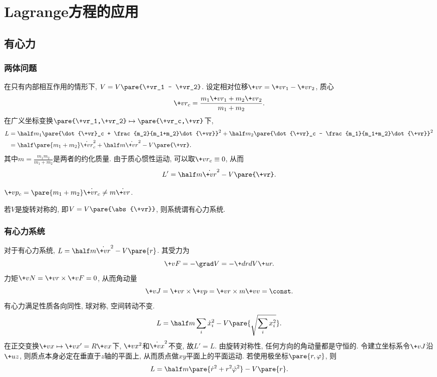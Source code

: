 \documentclass[../LectureNotes.tex]{subfiles}
\begin{document}
\section{Lagrange方程的应用} %
\label{sec:lagrange方程的应用}

\subsection{有心力} %
\label{sub:有心力}

\subsubsection{两体问题} %
\label{ssub:两体问题}

\begin{figure}[ht]
    \centering
\end{figure}
在只有内部相互作用的情形下, $V = V\pare{\+vr_1 - \+vr_2}$. 设定相对位移$\+vr = \+vr_1 - \+vr_2$, 质心
\[ \+vr_c = \frac{m_1\+vr_1 + m_2\+vr_2}{m_1+m_2}. \]
在广义坐标变换$\pare{\+vr_1,\+vr_2}\mapsto \pare{\+vr_c,\+vr}$下,
\begin{align*}
    L &= \half m_1\pare{\dot{\+vr}_c + \frac{m_2}{m_1+m_2}\dot{\+vr}}^2 + \half m_2 \pare{\dot{\+vr}_c - \frac{m_1}{m_1+m_2}\dot{\+vr}}^2 \\
    &= \half\pare{m_1+m_2}\dot{\+vr}_c^2 + \half m\dot{\+vr}^2 - V\pare{\+vr}.
\end{align*}
其中$\displaystyle m = \frac{m_1m_2}{m_1+m_2}$是两者的约化质量. 由于质心惯性运动, 可以取$\+vr_c \equiv 0$, 从而
\[ L' = \half m\dot{\+vr}^2 - V\pare{\+vr}. \]
\begin{remark}
    $\+vp_c = \pare{m_1+m_2}\dot{\+vr_c} \neq m\dot{\+vr}$.
\end{remark}
若$V$是旋转对称的, 即$V = V\pare{\abs{\+vr}}$, 则系统谓有心力系统.


\subsubsection{有心力系统} %
\label{ssub:有心力系统}

对于有心力系统, $\displaystyle L = \half m\dot{\+vr}^2 - V\pare{r}$. 其受力为
\[ \+vF = -\grad V = -\+drdV \+ur. \]
力矩$\+vN = \+vr\times\+vF = 0$, 从而角动量
\[ \+vJ = \+vr\times\+vp = \+vr\times m\+vv = \const. \]
有心力满足性质各向同性, 球对称, 空间转动不变.
\[ L = \half m \sum_i \dot{x}_i^2 - V\pare{\sqrt{\sum_i x_i^2}}. \]
在正交变换$\+vx \mapsto \+vx' = R\+vx$下, $\+vx^2$和$\dot{\+vx}^2$不变, 故$L'=L$. 由旋转对称性, 任何方向的角动量都是守恒的. 令建立坐标系令$\+vJ$沿$\+uz$, 则质点本身必定在垂直于$z$轴的平面上, 从而质点做$xy$平面上的平面运动. 若使用极坐标$\pare{r,\varphi}$, 则
\[ L = \half m\pare{\dot{r}^2 + r^2 \dot{\varphi}^2} - V\pare{r}. \]
\end{document}
